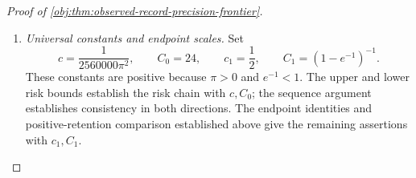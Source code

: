 \documentclass[11pt]{article}
\begin{document}
\begin{proof}[Proof of \cref{obj:thm:observed-record-precision-frontier}]
\begin{enumerate}
Choose the measurable rule sequence
\[
T_n(O,\xi)=T^\star_{n,d_n,q_n}(O),
\qquad n\ge4.
\]
The upper risk bound then supplies
\[
0\le
\sup_{\theta\in\mathcal M_{n,d_n}}
\mathcal L(T_n;\theta,q_n)
\le24F(n,d_n,q_n)
\longrightarrow0.
\]
Together with necessity, this proves the asserted equivalence.

\item \textit{Universal constants and endpoint scales.}
Set
\[
c=\frac1{2560000\pi^2},
\qquad
C_0=24,
\qquad
c_1=\frac12,
\qquad
C_1=(1-e^{-1})^{-1}.
\]
These constants are positive because \(\pi>0\) and \(e^{-1}<1\).
The upper and lower risk bounds establish the risk chain with \(c,C_0\);
the sequence argument establishes consistency in both directions.
The endpoint identities and positive-retention comparison established above
give the remaining assertions with \(c_1,C_1\).
\end{enumerate}
\end{proof}
\end{document}
